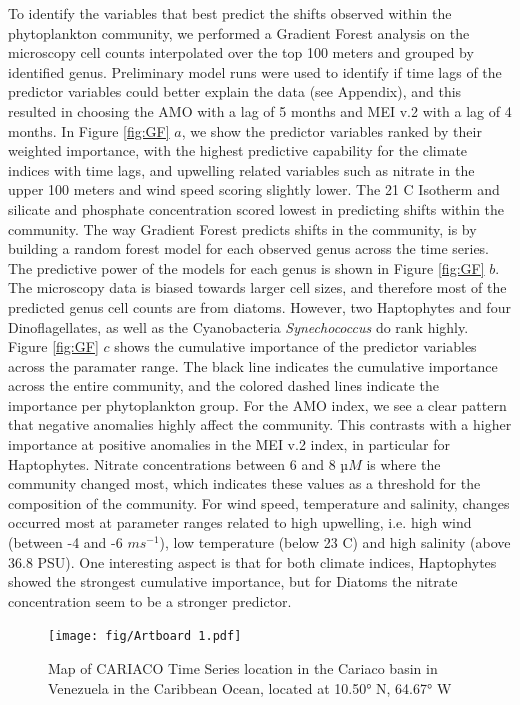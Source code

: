 \documentclass[draft]{agujournal2019}
\begin{document}
To identify the variables that best predict the shifts observed within the phytoplankton community, we performed a Gradient Forest analysis on the microscopy cell counts interpolated over the top 100 meters and grouped by identified genus. Preliminary model runs were used to identify if time lags of the predictor variables could better explain the data (see Appendix), and this resulted in choosing the AMO with a lag of 5 months and MEI v.2 with a lag of 4 months. In Figure \ref{fig:GF} $a$, we show the predictor variables ranked by their weighted importance, with the highest predictive capability for the climate indices with time lags, and upwelling related variables such as nitrate in the upper 100 meters and wind speed scoring slightly lower. The 21 \degree C Isotherm and silicate and phosphate concentration scored lowest in predicting shifts within the community. The way Gradient Forest predicts shifts in the community, is by building a random forest model for each observed genus across the time series. The predictive power of the models for each genus is shown in Figure \ref{fig:GF} $b$. The microscopy data is biased towards larger cell sizes, and therefore most of the predicted genus cell counts are from diatoms. However, two Haptophytes and four Dinoflagellates, as well as the Cyanobacteria \textit{Synechococcus} do rank highly.
Figure \ref{fig:GF} $c$ shows the cumulative importance of the predictor variables across the paramater range. The black line indicates the cumulative importance across the entire community, and the colored dashed lines indicate the importance per phytoplankton group. For the AMO index, we see a clear pattern that negative anomalies highly affect the community. This contrasts with a higher importance at positive anomalies in the MEI v.2 index, in particular for Haptophytes. Nitrate concentrations between 6 and 8 $µM$ is where the community changed most, which indicates these values as a threshold for the composition of the community. For wind speed, temperature and salinity, changes occurred most at parameter ranges related to high upwelling, i.e. high wind (between -4 and -6 $m s^{-1}$), low temperature (below 23 \degree C) and high salinity (above 36.8 PSU). One interesting aspect is that for both climate indices, Haptophytes showed the strongest cumulative importance, but for Diatoms the nitrate concentration seem to be a stronger predictor. 








\begin{figure}
\label{fig:map}
\noindent\texttt{[image: fig/Artboard 1.pdf]}
\caption{Map of CARIACO Time Series location in the Cariaco basin in Venezuela in the Caribbean Ocean, located at 10.50° N, 64.67° W}
\end{figure}
\end{document}
